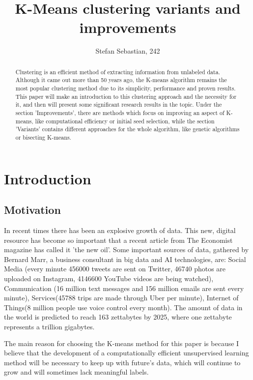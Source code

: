 \documentclass[12pt]{article}
\begin{document}
	\title{K-Means clustering variants and improvements}
	\author{Stefan Sebastian, 242}
	\date{}
	\maketitle
	
	\begin{abstract}
		Clustering is an efficient method of extracting information from unlabeled data. Although it came out more than 50 years ago, the K-means algorithm remains the most popular clustering method due to its simplicity, performance and proven results. This paper will make an introduction to this clustering approach and the necessity for it, and then will present some significant research results in the topic. Under the section 'Improvements', there are methods which focus on improving an aspect of K-means, like computational efficiency or initial seed selection, while the section 'Variants' contains different approaches for the whole algorithm, like genetic algorithms or bisecting K-means.
	\end{abstract}

	\newpage
	\tableofcontents
	\newpage
	
	\section{Introduction}
	\subsection{Motivation}
	In recent times there has been an explosive growth of data. This new, digital resource has become so important that a recent article from The Economist magazine has called it 'the new oil'\cite{TheMostValuableResource}. Some important sources of data, gathered by Bernard Marr\cite{HowMuchDataDoWeCreateEveryDay}, a business consultant in big data and AI technologies, are: Social Media (every minute 456000 tweets are sent on Twitter, 46740 photos are uploaded on Instagram, 4146600 YouTube videos are being watched), Communication (16 million text messages and 156 million emails are sent every minute), Services(45788 trips are made through Uber per minute), Internet of Things(8 million people use voice control every month). The amount of data in the world is predicted to reach 163 zettabytes by 2025\cite{WhatWillWeDoWhenTheWorldsDataHits163Zettabytes}, where one zettabyte represents a trillion gigabytes.
	
	The main reason for choosing the K-means method for this paper is because I believe that the development of a computationally efficient unsupervised learning method will be necessary to keep up with future's data, which will continue to grow and will sometimes lack meaningful labels.
	
\end{document}
